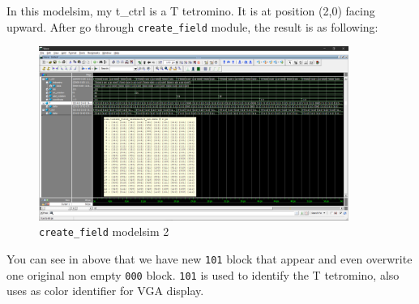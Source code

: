 \documentclass[scale = 0.9]{article}
\newcommand{\code}[1]{\colorbox{light-gray}{\texttt{#1}}} %
\begin{document}
\begin{enumerate}[label=(\alph*)]
        In this modelsim, my t\_ctrl is a T tetromino. It is at position (2,0) facing upward.
        After go through \code{create\_field} module, the result is as following:
        \begin{figure}[H]
          \begin{center}
            \includegraphics[width=0.9\textwidth]{create_field_2.png}
            \caption{\code{create\_field} modelsim 2}\label{create_field_2}
          \end{center}
        \end{figure}
        You can see in above that we have new \code{101} block that appear and even
        overwrite one original non empty \code{000} block. \code{101} is used to identify
        the T tetromino, also uses as color identifier for VGA display.


\end{enumerate}
\end{document}
